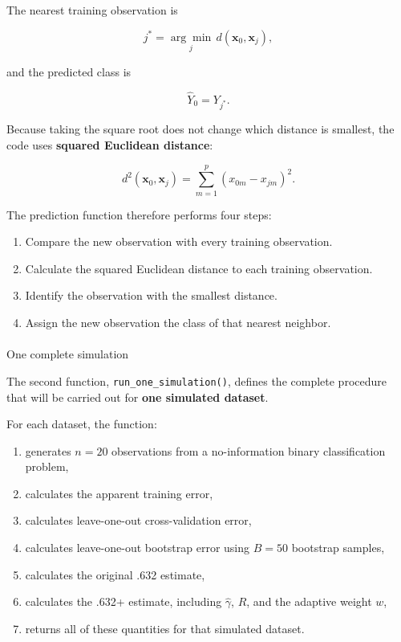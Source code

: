 \documentclass[
  letterpaper,
  DIV=11,
  numbers=noendperiod]{scrreprt}
\makeatletter
\let\oldparagraph\paragraph
\renewcommand{\paragraph}{
    \@ifstar
      \xxxParagraphStar
      \xxxParagraphNoStar
  }
\newcommand{\xxxParagraphStar}[1]{\oldparagraph*{#1}\mbox{}}
\newcommand{\xxxParagraphNoStar}[1]{\oldparagraph{#1}\mbox{}}
\providecommand{\tightlist}{%
  \setlength{\itemsep}{0pt}\setlength{\parskip}{0pt}}
\makeatother
\begin{document}
The nearest training observation is

\[
j^*
=
\underset{j}{\arg\min}\,
d(\mathbf{x}_0,\mathbf{x}_j),
\]

and the predicted class is

\[
\widehat{Y}_0
=
Y_{j^*}.
\]

Because taking the square root does not change which distance is
smallest, the code uses \textbf{squared Euclidean distance}:

\[
d^2(\mathbf{x}_0,\mathbf{x}_j)
=
\sum_{m=1}^{p}
(x_{0m}-x_{jm})^2.
\]

The prediction function therefore performs four steps:

\begin{enumerate}
\def\labelenumi{\arabic{enumi}.}
\tightlist
\item
  Compare the new observation with every training observation.
\item
  Calculate the squared Euclidean distance to each training observation.
\item
  Identify the observation with the smallest distance.
\item
  Assign the new observation the class of that nearest neighbor.
\end{enumerate}

\paragraph{One complete simulation}\label{one-complete-simulation}

The second function, \texttt{run\_one\_simulation()}, defines the
complete procedure that will be carried out for \textbf{one simulated
dataset}.

For each dataset, the function:

\begin{enumerate}
\def\labelenumi{\arabic{enumi}.}
\tightlist
\item
  generates \(n=20\) observations from a no-information binary
  classification problem,
\item
  calculates the apparent training error,
\item
  calculates leave-one-out cross-validation error,
\item
  calculates leave-one-out bootstrap error using \(B=50\) bootstrap
  samples,
\item
  calculates the original .632 estimate,
\item
  calculates the .632+ estimate, including \(\widehat{\gamma}\), \(R\),
  and the adaptive weight \(w\),
\item
  returns all of these quantities for that simulated dataset.
\end{enumerate}
\end{document}
